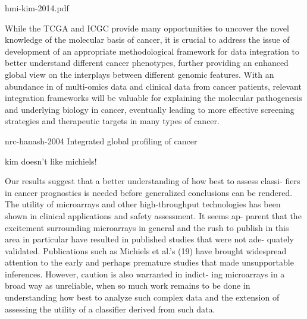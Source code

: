 hmi-kim-2014.pdf

While the TCGA and ICGC provide many opportunities to uncover the novel
knowledge of the molecular basis of cancer, it is crucial to address the issue
of development of an appropriate methodological framework for data integration
to better understand different cancer phenotypes, further providing an enhanced
global view on the interplays between different genomic features. With an
abundance in of multi-omics data and clinical data from cancer patients,
relevant integration frameworks will be valuable for explaining the molecular
pathogenesis and underlying biology in cancer, eventually leading to more
effective screening strategies and therapeutic targets in many types of cancer.

nrc-hanash-2004
Integrated global profiling of cancer

kim doesn't like michiels!

Our results suggest that a better understanding of
how best to assess classi- fiers in cancer prognostics is needed before
generalized conclusions can be rendered. The utility of microarrays and other
high-throughput technologies has been shown in clinical applications and safety
assessment. It seems ap- parent that the excitement surrounding microarrays in
general and the rush to publish in this area in particular have resulted in
published studies that were not ade- quately validated. Publications such as
Michiels et al.'s (19) have brought widespread attention to the early and
perhaps premature studies that made unsupportable inferences. However, caution
is also warranted in indict- ing microarrays in a broad way as unreliable, when
so much work remains to be done in understanding how best to analyze such
complex data and the extension of assessing the utility of a classifier derived
from such data.




\bigskip



